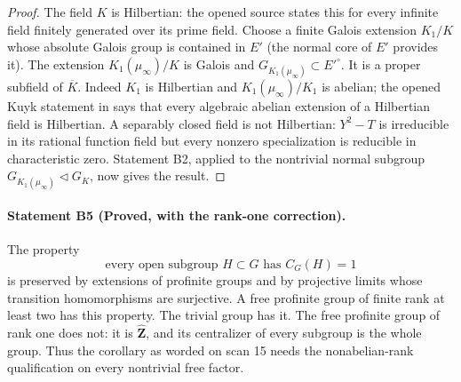 \begin{proof}
The field $K$ is Hilbertian: the opened source
\cite[\S4, Theorem 2(e)]{B_Geyer2012} states this for every infinite field
finitely generated over its prime field. Choose a finite Galois extension
$K_1/K$ whose absolute Galois group is contained in $E'$ (the normal core
of $E'$ provides it). The extension $K_1(\mu_\infty)/K$ is Galois and
$G_{K_1(\mu_\infty)}\subset E'^\circ$.
It is a proper subfield of $\overline K$. Indeed $K_1$ is Hilbertian and
$K_1(\mu_\infty)/K_1$ is abelian; the opened Kuyk statement in
\cite[\S4, Theorem 2(g)(2)]{B_Geyer2012} says that every algebraic abelian
extension of a Hilbertian field is Hilbertian. A separably closed field is
not Hilbertian: $Y^2-T$ is irreducible in its rational function field but
every nonzero specialization is reducible in characteristic zero.
Statement B2, applied to the nontrivial normal subgroup
$G_{K_1(\mu_\infty)}\triangleleft G_K$, now gives the result.
\end{proof}

\paragraph{Statement B5 (Proved, with the rank-one correction).}\label{res:B5}
The property
\[
 \text{every open subgroup $H\subset G$ has $C_G(H)=1$}
 \tag{B-slim}
\]
is preserved by extensions of profinite groups and by projective limits
whose transition homomorphisms are surjective. A free profinite group of
finite rank at least two has this property. The trivial group has it.
The free profinite group of rank one does not: it is $\widehat{\mathbf Z}$,
and its centralizer of every subgroup is the whole group. Thus the
corollary as worded on scan 15 needs the nonabelian-rank qualification on
every nontrivial free factor.

